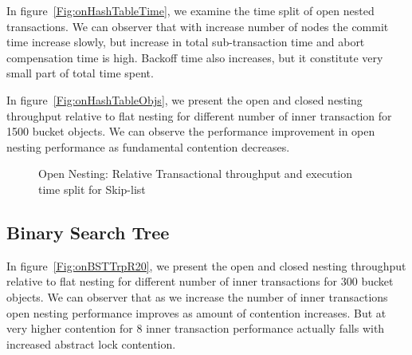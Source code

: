 \documentclass[12pt,english]{report}
\begin{document}
In figure~\ref{Fig:onHashTableTime}, we examine the time split of open nested transactions. We can observer 
that with increase number of nodes the commit time increase slowly, but increase in total sub-transaction time and abort compensation time is high. Backoff time also increases, but it constitute very small part of total time spent.  

In figure~\ref{Fig:onHashTableObjs}, we present the open and closed nesting throughput relative to flat nesting for different number of inner transaction for 1500 bucket objects. We can observe the performance improvement in open nesting performance as fundamental contention decreases.

\begin{figure}[H]
\centering
{}
\end{figure}
\begin{figure}[H]
\centering
{}
\end{figure}
\begin{figure}[H]
\centering
{}
\end{figure}
\begin{figure}[H]
\centering
{}
\caption{Open Nesting: Relative Transactional throughput and execution time split for Skip-list}
\label{Fig:cpHashTable}
\end{figure}

\subsection{Binary Search Tree}

In figure~\ref{Fig:onBSTTrpR20}, we present the open and closed nesting throughput relative to flat nesting for different number of inner transactions for 300 bucket objects. We can observer that as we increase the number of inner transactions open nesting performance improves as amount of contention increases. But at very higher contention for 8 inner transaction performance actually falls with increased abstract lock contention. 
\end{document}
